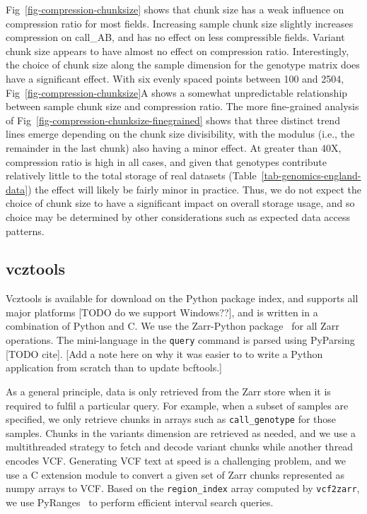 \documentclass[a4paper,num-refs]{oup-contemporary}
\begin{document}
Fig~\ref{fig-compression-chunksize} shows that chunk size has a
weak influence on compression ratio for most fields.
Increasing sample chunk size slightly increases
compression on call\_AB, and has no effect on less compressible
fields. Variant chunk size appears to have almost no effect
on compression ratio.
Interestingly, the choice of chunk size along the sample dimension for the
genotype matrix does have a significant effect.
With six evenly spaced points between 100 and 2504,
Fig~\ref{fig-compression-chunksize}A shows a somewhat unpredictable
relationship between sample chunk size and compression ratio.
The more fine-grained analysis of
Fig~\ref{fig-compression-chunksize-finegrained} shows that three
distinct trend lines emerge depending on the chunk size
divisibility, with the modulus
(i.e., the remainder in the last chunk) also having a minor effect.
At greater than 40X,
compression ratio is
high in all cases, and given that genotypes contribute relatively
little to the total storage of real datasets
(Table~\ref{tab-genomics-england-data}) the effect will
likely be fairly minor in practice.
Thus, we do not expect the choice of chunk size to have a significant
impact on overall storage usage, and so choice may be
determined by other considerations such as expected data
access patterns.

\subsection{vcztools}
Vcztools is available for download on the Python package index, and
supports all major platforms [TODO do we support Windows??],
and is written in a combination of Python and C.
We use
the Zarr-Python package~\citep{zarrpython} for all Zarr operations.
The mini-language in the \texttt{query} command is parsed using
PyParsing [TODO cite].
[Add a note here on why it was easier to to write a Python application
from scratch than to update bcftools.]

As a general principle, data is only retrieved from the Zarr store
when it is required to fulfil a particular query. For example,
when a subset of samples are specified, we only retrieve chunks
in arrays such as \texttt{call\_genotype} for those
samples. Chunks in the variants dimension are retrieved as needed,
and we use a multithreaded strategy to fetch and decode variant chunks
while another thread encodes VCF. Generating VCF text at speed
is a challenging problem, and we use a C extension module to convert
a given set of Zarr chunks represented as numpy arrays to VCF.
Based on the \texttt{region\_index} array computed by \texttt{vcf2zarr},
we use PyRanges~\citep{stovner2020pyranges} to perform efficient interval
search queries.
\end{document}
